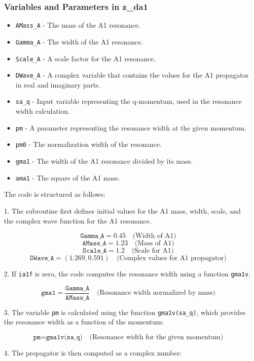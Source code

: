 \documentclass[12pt]{article}
\begin{document}
\begin{itemize}
\subsubsection*{Variables and Parameters in z\_da1}
\begin{itemize}
  \item \texttt{AMass\_A} - The mass of the A1 resonance.
  \item \texttt{Gamma\_A} - The width of the A1 resonance.
  \item \texttt{Scale\_A} - A scale factor for the A1 resonance.
  \item \texttt{DWave\_A} - A complex variable that contains the values for the A1 propagator in real and imaginary parts.
  \item \texttt{sa\_q} - Input variable representing the q-momentum, used in the resonance width calculation.
  \item \texttt{pm} - A parameter representing the resonance width at the given momentum.
  \item \texttt{pm0} - The normalization width of the resonance.
  \item \texttt{gma1} - The width of the A1 resonance divided by its mass.
  \item \texttt{ama1} - The square of the A1 mass.
\end{itemize}

The code is structured as follows:

1. The subroutine first defines initial values for the A1 mass, width, scale, and the complex wave function for the A1 resonance.

\[
\texttt{Gamma\_A} = 0.45 \quad \text{(Width of A1)}
\]
\[
\texttt{AMass\_A} = 1.23 \quad \text{(Mass of A1)}
\]
\[
\texttt{Scale\_A} = 1.2 \quad \text{(Scale for A1)}
\]
\[
\texttt{DWave\_A} = (1.269, 0.591) \quad \text{(Complex values for A1 propagator)}
\]

2. If \texttt{ia1f} is zero, the code computes the resonance width using a function \texttt{gma1v}.

\[
\texttt{gma1} = \frac{\texttt{Gamma\_A}}{\texttt{AMass\_A}} \quad \text{(Resonance width normalized by mass)}
\]

3. The variable \texttt{pm} is calculated using the function \texttt{gma1v(sa\_q)}, which provides the resonance width as a function of the momentum:

\[
\texttt{pm} = \texttt{gma1v(sa\_q)} \quad \text{(Resonance width for the given momentum)}
\]

4. The propagator is then computed as a complex number:


\end{itemize}
\end{document}
